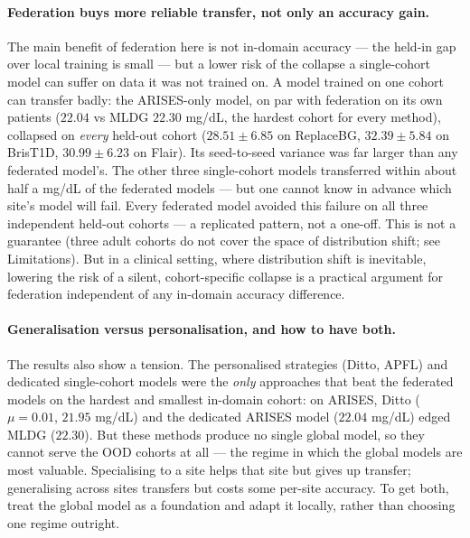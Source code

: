 \documentclass[10pt,letterpaper]{article}
\begin{document}
\paragraph{Federation buys more reliable transfer, not only an accuracy gain.}
The main benefit of federation here is not in-domain accuracy --- the held-in
gap over local training is small --- but a lower risk of the collapse a
single-cohort model can suffer on data it was not trained on. A model trained
on one cohort can transfer badly: the ARISES-only model, on par with
federation on its own patients ($22.04$ vs MLDG $22.30$ mg/dL, the hardest
cohort for every method), collapsed on \emph{every} held-out cohort ($28.51
\pm 6.85$ on ReplaceBG, $32.39 \pm 5.84$ on BrisT1D, $30.99 \pm 6.23$ on
Flair). Its seed-to-seed variance was far larger than any federated model's.
The other three single-cohort models transferred within about half a mg/dL of
the federated models --- but one cannot know in advance which site's model
will fail. Every federated model avoided this failure on all three
independent held-out cohorts --- a replicated pattern, not a one-off. This is
not a guarantee (three adult cohorts do not cover the space of distribution
shift; see Limitations). But in a clinical setting, where distribution shift
is inevitable, lowering the risk of a silent, cohort-specific collapse is a
practical argument for federation independent of any in-domain accuracy
difference.

\paragraph{Generalisation versus personalisation, and how to have both.} The
results also show a tension. The personalised strategies (Ditto, APFL) and
dedicated single-cohort models were the \emph{only} approaches that beat the
federated models on the hardest and smallest in-domain cohort: on ARISES,
Ditto ($\mu{=}0.01$, $21.95$ mg/dL) and the dedicated ARISES model ($22.04$
mg/dL) edged MLDG ($22.30$). But these methods produce no single global model,
so they cannot serve the OOD cohorts at all --- the regime in which the global
models are most valuable. Specialising to a site helps that site but gives up
transfer; generalising across sites transfers but costs some per-site
accuracy. To get both, treat the global model as a foundation and adapt it
locally, rather than choosing one regime outright.
\end{document}
